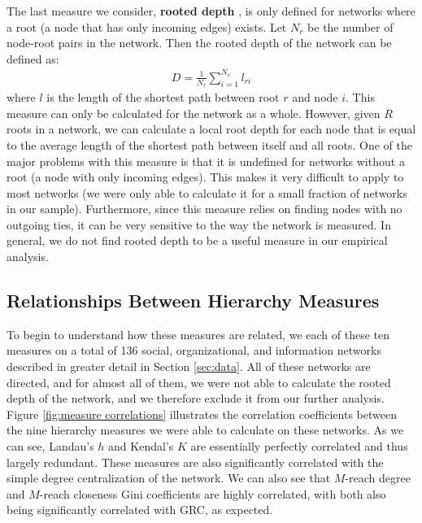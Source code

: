 \documentclass[3p,times]{elsarticle}
\begin{document}
The last measure we consider, \textbf{rooted depth} \cite{depth},  is only defined for networks where a root (a node that has only incoming edges) exists. Let $N_{r}$ be the number of node-root pairs in the network. Then the rooted depth of the network can be defined as:
\begin{align}
	D=\frac{1}{N_{r}}\sum_{i=1}^{N_r}{l_{ri}}
\end{align}
where $l$ is the length of the shortest path between root $r$ and node $i$. This measure can only be calculated for the network as a whole. However, given $R$ roots in a network, we can calculate a local root depth for each node that is equal to the average length of the shortest path between itself and all roots. One of the major problems with this measure is that it is undefined for networks without a root (a node with only incoming edges). This makes it very difficult to apply to most networks (we were only able to calculate it for a small fraction of networks in our sample). Furthermore, since this measure relies on finding nodes with no outgoing ties, it can be very sensitive to the way the network is measured. In general, we do not find rooted depth to be a useful measure in our empirical analysis.

\subsection{Relationships Between Hierarchy Measures}
To begin to understand how these measures are related, we each of these ten measures on a total of 136 social, organizational, and information networks described in greater detail in Section \ref{sec:data}. All of these networks are directed, and for almost all of them, we were not able to calculate the rooted depth of the network, and we therefore exclude it from our further analysis. Figure \ref{fig:measure correlations} illustrates the correlation coefficients between the nine hierarchy measures we were able to calculate on these networks. As we can see,  Landau's $h$ and Kendal's $K$ are essentially perfectly correlated and thus largely redundant. These measures are also significantly correlated with the simple degree centralization of the network. We can also see that $M$-reach degree and $M$-reach closeness Gini coefficients are highly correlated, with both also being significantly correlated with GRC, as expected.
\end{document}
